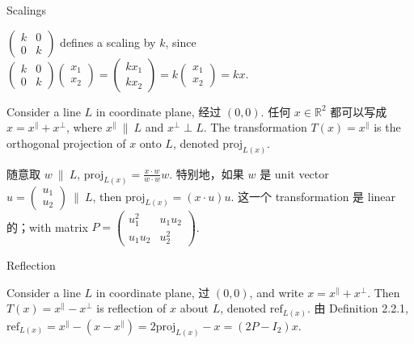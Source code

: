 \begin{theorem}{Scalings}

\(\begin{pmatrix}
k & 0 \\
0 & k
\end{pmatrix}\) defines a scaling by \(k\), since \(\begin{pmatrix}
k & 0 \\
0 & k
\end{pmatrix}\begin{pmatrix}
x_{1} \\
x_{2}
\end{pmatrix} = \begin{pmatrix}
{kx_{1}} \\
{kx_{2}}
\end{pmatrix} = k\begin{pmatrix}
x_{1} \\
x_{2}
\end{pmatrix} = kx\).

\end{theorem}

\begin{definition}{}

Consider a line \(L\) in coordinate plane, 经过 \(\left( {0,0} \right)\). 任何 \(x \in \mathbb{R}^{2}\) 都可以写成 \(x = x^{\parallel} + x^{\perp}\), where \(x^{\parallel}\ \|\ L\) and \(x^{\perp} \perp L\). The transformation \(T(x) = x^{\parallel}\) is the orthogonal projection of \(x\) onto \(L\), denoted \(\text{proj}_{L{(x)}}\).

随意取 \(w\ \|\ L\), \(\text{proj}_{L{(x)}} = \frac{x \cdot w}{w \cdot w}w\). 特别地，如果 \(w\) 是 unit vector \(u = \begin{pmatrix}
u_{1} \\
u_{2}
\end{pmatrix}\ \|\ L\), then \(\text{proj}_{L{(x)}} = \left( {x \cdot u} \right)u\). 这一个 transformation 是 linear 的；with matrix \(P = \begin{pmatrix}
u_{1}^{2} & {u_{1}u_{2}} \\
{u_{1}u_{2}} & u_{2}^{2}
\end{pmatrix}\).

\end{definition}

\begin{definition}{Reflection}

Consider a line \(L\) in coordinate plane, 过 \(\left( {0,0} \right)\), and write \(x = x^{\parallel} + x^{\perp}\). Then \(T(x) = x^{\parallel} - x^{\perp}\) is reflection of \(x\) about \(L\), denoted \(\text{ref}_{L{(x)}}\). 由 Definition 2.2.1, \(\text{ref}_{L{(x)}} = x^{\parallel} - \left( {x - x^{\parallel}} \right) = 2\text{proj}_{L{(x)}} - x = \left( {2P - I_{2}} \right)x\).

\end{definition}

